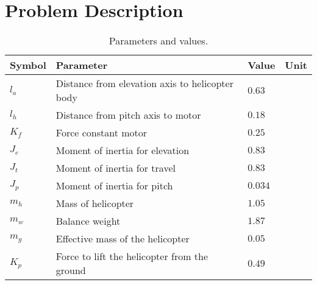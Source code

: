 \section{Problem Description}\label{sec:prob_descr}
\label{text:problem_description}

\begin{table}[p]
	\centering
	\caption{Parameters and values.}
	\begin{tabular}{llll}
		\hline
		Symbol & Parameter & Value & Unit \\
		\hline
		$l_a$ & Distance from elevation axis to helicopter body & $0.63$ & \meter \\
		$l_h$ & Distance from pitch axis to motor & $0.18$ & \meter \\
		$K_f$ & Force constant motor & $0.25$ & \newton\per\volt \\
		$J_e$ & Moment of inertia for elevation & $0.83$ & \kilogram\usk\square\meter \\
		$J_t$ & Moment of inertia for travel & $0.83$ & \kilogram\usk\square\meter \\
		$J_p$ & Moment of inertia for pitch & $0.034$ & \kilogram\usk\square\meter \\
		$m_h$ & Mass of helicopter & $1.05$ & \kilogram \\
		$m_w$ & Balance weight & $1.87$ & \kilogram \\
		$m_g$ & Effective mass of the helicopter & $0.05$ & \kilogram \\
		$K_p$ & Force to lift the helicopter from the ground & $0.49$ & \newton \\
		\hline
	\end{tabular}
	\label{tab:parameters}
\end{table}

